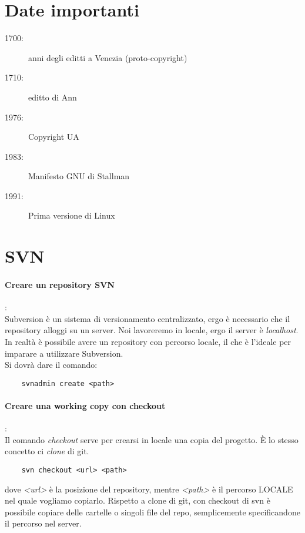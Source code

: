 \documentclass[a4paper]{article}
\begin{document}
	\section{Date importanti}
	
	\begin{description}
		\item[1700:] anni degli editti a Venezia (proto-copyright)
		\item[1710:] editto di Ann
		\item[1976:] Copyright UA
		\item[1983:] Manifesto GNU di Stallman
		\item[1991:] Prima versione di Linux
	\end{description}
	
	
	\section{SVN}
	
	\paragraph{Creare un repository SVN}: \\
	Subversion è un sistema di versionamento centralizzato, ergo è necessario che il repository alloggi su un server. Noi lavoreremo in locale, ergo il server è \textit{localhost}. In realtà è possibile avere un repository con percorso locale, il che è l'ideale per imparare a utilizzare Subversion.\\
	Si dovrà dare il comando:
	\begin{verbatim}
	svnadmin create <path>
	\end{verbatim}
	
	\paragraph{Creare una working copy con checkout}:\\
	Il comando \textit{checkout} serve per crearsi in locale una copia del progetto. È lo stesso concetto ci \textit{clone} di git.
	\begin{verbatim}
	svn checkout <url> <path>
	\end{verbatim}
	dove \textit{<url>} è la posizione del repository, mentre \textit{<path>} è il percorso LOCALE nel quale vogliamo copiarlo.
	Rispetto a clone di git, con checkout di svn è possibile copiare delle cartelle o singoli file del repo, semplicemente specificandone il percorso nel server.
	
\end{document}
